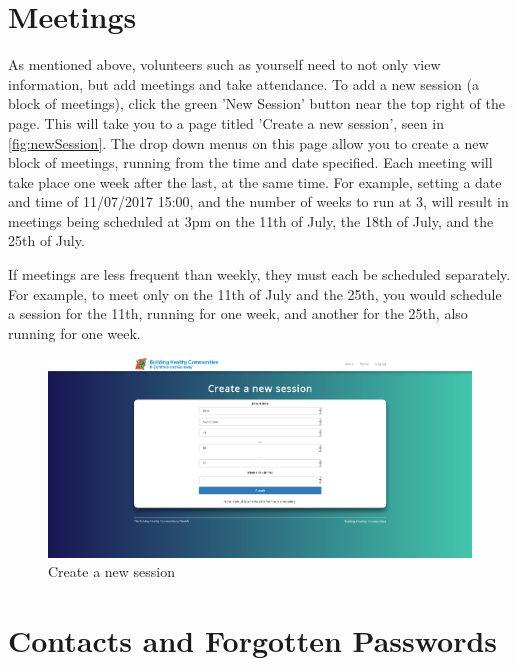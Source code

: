 \documentclass{bhcguides}
\begin{document}
\pagebreak

\section{Meetings}
\label{sec:meetings}

As mentioned above, volunteers such as yourself need to not only view information, but add meetings and take attendance. To add a new session (a block of meetings), click the green 'New Session' button near the top right of the page. This will take you to a page titled 'Create a new session', seen in \autoref{fig:newSession}. The drop down menus on this page allow you to create a new block of meetings, running from the time and date specified. Each meeting will take place one week after the last, at the same time. For example, setting a date and time of 11/07/2017 15:00, and the number of weeks to run at 3, will result in meetings being scheduled at 3pm on the 11th of July, the 18th of July, and the 25th of July. 

If meetings are less frequent than weekly, they must each be scheduled separately. For example, to meet only on the 11th of July and the 25th, you would schedule a session for the 11th, running for one week, and another for the 25th, also running for one week.

\begin{figure}[h]
 \centerline{\includegraphics[width=\textwidth, height=\textheight, keepaspectratio]{newsession.png}}
 \caption{Create a new session}
 \label{fig:newSession}
\end{figure}

\pagebreak

\section{Contacts and Forgotten Passwords}
\label{sec:contacts}
\end{document}
